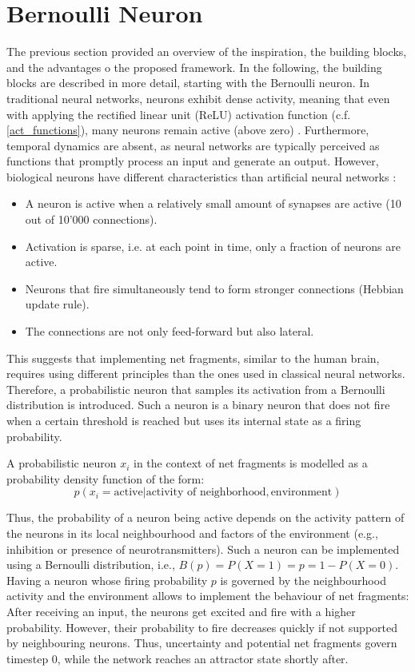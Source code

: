 \section{Bernoulli Neuron}
The previous section provided an overview of the inspiration, the building blocks, and the advantages o the proposed framework. In the following, the building blocks are described in more detail, starting with the Bernoulli neuron.
In traditional neural networks, neurons exhibit dense activity, meaning that even with applying the rectified linear unit (ReLU) activation function (c.f. \eqref{act_functions}), many neurons remain active (above zero) . Furthermore, temporal dynamics are absent, as neural networks are typically perceived as functions that promptly process an input and generate an output. However, biological neurons have different characteristics than artificial neural networks :

\begin{itemize}
    \item A neuron is active when a relatively small amount of synapses are active (10 out of 10'000 connections). 
    \item Activation is sparse, i.e. at each point in time, only a fraction of neurons are active.
    \item Neurons that fire simultaneously tend to form stronger connections (Hebbian update rule).
    \item The connections are not only feed-forward but also lateral.
\end{itemize}

This suggests that implementing net fragments, similar to the human brain, requires using different principles than the ones used in classical neural networks. Therefore, a probabilistic neuron that samples its activation from a Bernoulli distribution is introduced.
Such a neuron is a binary neuron that does not fire when a certain threshold is reached but uses its internal state as a firing probability.

A probabilistic neuron $x_i$ in the context of net fragments is modelled as a probability density function of the form:
\begin{equation}
    p(x_i = \text{active} | \text{activity of neighborhood}, \text{environment}) 
\end{equation}

Thus, the probability of a neuron being active depends on the activity pattern of the neurons in its local neighbourhood and factors of the environment (e.g., inhibition or presence of neurotransmitters).
Such a neuron can be implemented using a Bernoulli distribution, i.e., $B(p) = P(X = 1) = p = 1 - P(X=0)$. Having a neuron whose firing probability $p$ is governed by the neighbourhood activity and the environment allows to implement the behaviour of net fragments: After receiving an input, the neurons get excited and fire with a higher probability. However, their probability to fire decreases quickly if not supported by neighbouring neurons. Thus, uncertainty and potential net fragments govern timestep 0, while the network reaches an attractor state shortly after. 

